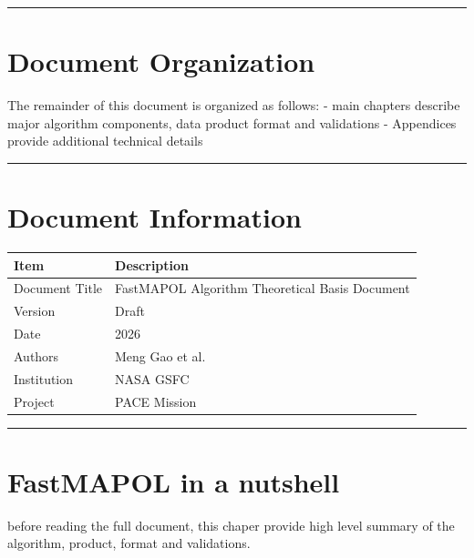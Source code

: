 \documentclass[
  letterpaper,
]{scrbook}
\begin{document}
\begin{center}\rule{0.5\linewidth}{0.5pt}\end{center}


\chapter{Document Organization}\label{document-organization}

The remainder of this document is organized as follows: - main chapters
describe major algorithm components, data product format and validations
- Appendices provide additional technical details

\begin{center}\rule{0.5\linewidth}{0.5pt}\end{center}


\chapter{Document Information}\label{document-information}

\begin{longtable}[]{@{}ll@{}}
\toprule\noalign{}
Item & Description \\
\midrule\noalign{}
\endhead
\bottomrule\noalign{}
\endlastfoot
Document Title & FastMAPOL Algorithm Theoretical Basis Document \\
Version & Draft \\
Date & 2026 \\
Authors & Meng Gao et al. \\
Institution & NASA GSFC \\
Project & PACE Mission \\
\end{longtable}

\begin{center}\rule{0.5\linewidth}{0.5pt}\end{center}


\chapter{FastMAPOL in a nutshell}\label{fastmapol-in-a-nutshell}

before reading the full document, this chaper provide high level summary
of the algorithm, product, format and validations.
\end{document}
